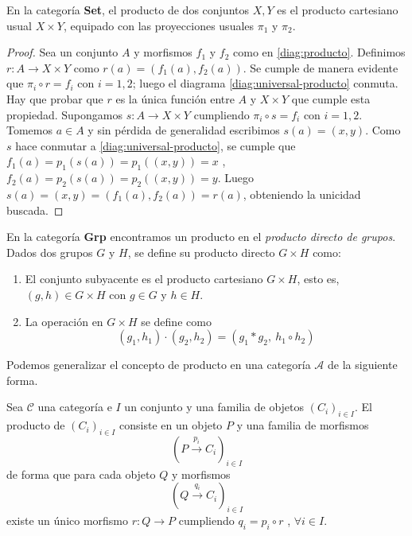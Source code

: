 \begin{ejemplo}
    En la categoría \textbf{Set}, el producto de dos conjuntos $X,Y$ es el producto cartesiano usual $X \times Y$, equipado con las proyecciones usuales $\pi_{1}$ y $\pi_{2}$. 
\end{ejemplo}
\begin{proof}
    Sea un conjunto $A$ y morfismos $f_1$ y $f_2$ como en \ref{diag:producto}. Definimos $r: A \longrightarrow X \times Y$ como $r(a) = (f_1(a),f_2(a))$. Se cumple de manera evidente que $\pi_i \circ r = f_i$ con $i=1,2$; luego el diagrama \ref{diag:universal-producto} conmuta. Hay que probar que $r$ es la única función entre $A$ y $X \times Y$ que cumple esta propiedad. Supongamos $s: A \longrightarrow X \times Y$ cumpliendo $\pi_i \circ s = f_i$ con $i=1,2$. Tomemos $a \in A$ y sin pérdida de generalidad escribimos $s(a) = (x,y)$. Como $s$ hace conmutar a \ref{diag:universal-producto}, se cumple que $f_1(a) = p_1(s(a)) = p_1((x,y)) = x$ , $f_2(a) = p_2(s(a)) = p_2((x,y)) = y$. Luego $s(a) = (x,y) = (f_1(a),f_2(a)) = r(a)$, obteniendo la unicidad buscada.
\end{proof}    

\begin{ejemplo}
    En la categoría \textbf{Grp} encontramos un producto en el \textit{producto directo de grupos}. Dados dos grupos $G$ y $H$, se define su producto directo $G \times H$ como: 
    \begin{enumerate}
        \item El conjunto subyacente es el producto cartesiano $G\times H$, esto es, $(g,h) \in G \times H$ con $g \in G$ y $h \in H$.
        \item La operación en $G \times H$ se define como \begin{equation}
            (g_1,h_1) \cdot (g_2,h_2) = (g_1*g_2, \ h_1\circ h_2)
        \end{equation}
    \end{enumerate}
\end{ejemplo}

Podemos generalizar el concepto de producto en una categoría $\mathscr{A}$ de la siguiente forma.

\begin{definicion}
    Sea $\mathscr{C}$ una categoría e $I$ un conjunto y una familia de objetos $\left(C_i\right)_{i\in I}$. El producto de $\left(C_i\right)_{i\in I}$ consiste en un objeto $P$ y una familia de morfismos \begin{equation}
        \left(P \xrightarrow{p_i} C_i\right)_{i \in I}
    \end{equation}
    de forma que para cada objeto $Q$ y morfismos \begin{equation}
        \left(Q \xrightarrow{q_i} C_i\right)_{i \in I}
    \end{equation}
    existe un único morfismo $r: Q \longrightarrow P$ cumpliendo $q_i = p_i \circ r$ , $\forall i \in I$.
\end{definicion}

